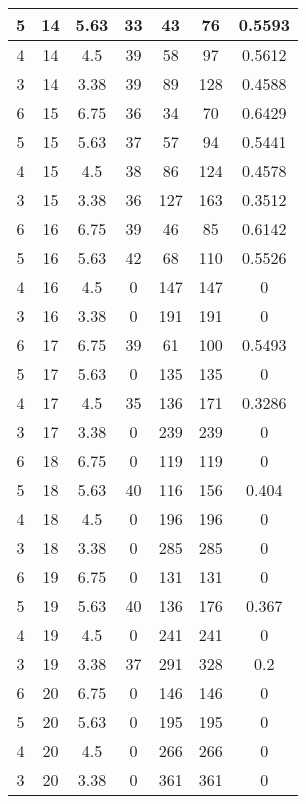 \documentclass[letterpaper, 12pt]{article}
\begin{document}
\begin{longtable}{|c|c|c|c|c|c|c|}
\hline
5 & 14 & 5.63 & 33 & 43 & 76 & 0.5593 \\
\hline
4 & 14 & 4.5 & 39 & 58 & 97 & 0.5612 \\
\hline
3 & 14 & 3.38 & 39 & 89 & 128 & 0.4588 \\
\hline
6 & 15 & 6.75 & 36 & 34 & 70 & 0.6429 \\
\hline
5 & 15 & 5.63 & 37 & 57 & 94 & 0.5441 \\
\hline
4 & 15 & 4.5 & 38 & 86 & 124 & 0.4578 \\
\hline
3 & 15 & 3.38 & 36 & 127 & 163 & 0.3512 \\
\hline
6 & 16 & 6.75 & 39 & 46 & 85 & 0.6142 \\
\hline
5 & 16 & 5.63 & 42 & 68 & 110 & 0.5526 \\
\hline
4 & 16 & 4.5 & 0 & 147 & 147 & 0 \\
\hline
3 & 16 & 3.38 & 0 & 191 & 191 & 0 \\
\hline
6 & 17 & 6.75 & 39 & 61 & 100 & 0.5493 \\
\hline
5 & 17 & 5.63 & 0 & 135 & 135 & 0 \\
\hline
4 & 17 & 4.5 & 35 & 136 & 171 & 0.3286 \\
\hline
3 & 17 & 3.38 & 0 & 239 & 239 & 0 \\
\hline
6 & 18 & 6.75 & 0 & 119 & 119 & 0 \\
\hline
5 & 18 & 5.63 & 40 & 116 & 156 & 0.404 \\
\hline
4 & 18 & 4.5 & 0 & 196 & 196 & 0 \\
\hline
3 & 18 & 3.38 & 0 & 285 & 285 & 0 \\
\hline
6 & 19 & 6.75 & 0 & 131 & 131 & 0 \\
\hline
5 & 19 & 5.63 & 40 & 136 & 176 & 0.367 \\
\hline
4 & 19 & 4.5 & 0 & 241 & 241 & 0 \\
\hline
3 & 19 & 3.38 & 37 & 291 & 328 & 0.2 \\
\hline
6 & 20 & 6.75 & 0 & 146 & 146 & 0 \\
\hline
5 & 20 & 5.63 & 0 & 195 & 195 & 0 \\
\hline
4 & 20 & 4.5 & 0 & 266 & 266 & 0 \\
\hline
3 & 20 & 3.38 & 0 & 361 & 361 & 0 \\
\hline
\end{longtable}
\end{document}

